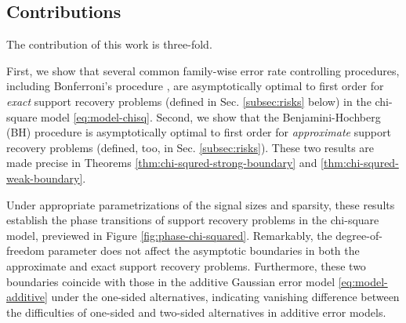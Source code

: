 \subsection{Contributions}

The contribution of this work is three-fold.

First, we show that several common family-wise error rate controlling procedures, including Bonferroni's procedure \cite{dunn1961multiple}, are asymptotically optimal to first order for \emph{exact} support recovery problems (defined in Sec. \ref{subsec:risks} below) in the chi-square model \eqref{eq:model-chisq}.
Second, we show that the Benjamini-Hochberg (BH) procedure \cite{benjamini1995controlling} is asymptotically optimal to first order for \emph{approximate} support recovery problems (defined, too, in Sec. \ref{subsec:risks}).
These two results are made precise in Theorems \ref{thm:chi-squred-strong-boundary} and \ref{thm:chi-squred-weak-boundary}.

Under appropriate parametrizations of the signal sizes and sparsity, these results establish the phase transitions of support recovery problems in the chi-square model, previewed in Figure \ref{fig:phase-chi-squared}.
Remarkably, the degree-of-freedom parameter does not affect the asymptotic boundaries in both the approximate and exact support recovery problems.
Furthermore, these two boundaries coincide with those in the additive Gaussian error model \eqref{eq:model-additive} under the one-sided alternatives, indicating vanishing difference between the difficulties of one-sided and two-sided alternatives in additive error models.


